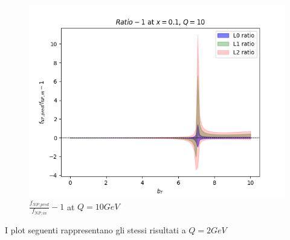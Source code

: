 \documentclass{article}
\begin{document}
\begin{itemize}
\begin{figure}[H]
\begin{minipage}{0.45\textwidth}
        \includegraphics[width=\textwidth]{Images/unc_levels/RealVsPredRatio_f_NP_Q_10_x_0.1.png}
        \caption{$x=0.1$}
    \end{minipage}
    \caption{$\frac{f_{NP, pred}}{f_{NP, in}}-1$ at $Q=10 GeV$}
    \end{figure}

    I plot seguenti rappresentano gli stessi risultati a $Q=2GeV$
    

\end{itemize}
\end{document}
